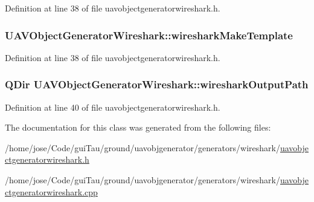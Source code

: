 Definition at line 38 of file uavobjectgeneratorwireshark.\-h.

\hypertarget{class_u_a_v_object_generator_wireshark_afda0123ec94dd04a3273d5916f94c880}{
\subsubsection[{wireshark\-Make\-Template}]{ U\-A\-V\-Object\-Generator\-Wireshark\-::wireshark\-Make\-Template}}\label{class_u_a_v_object_generator_wireshark_afda0123ec94dd04a3273d5916f94c880}


Definition at line 38 of file uavobjectgeneratorwireshark.\-h.

\hypertarget{class_u_a_v_object_generator_wireshark_a7b0aa9382772edcb5f83a441c739660b}{
\subsubsection[{wireshark\-Output\-Path}]{\setlength{\rightskip}{0pt plus 5cm}Q\-Dir U\-A\-V\-Object\-Generator\-Wireshark\-::wireshark\-Output\-Path}}\label{class_u_a_v_object_generator_wireshark_a7b0aa9382772edcb5f83a441c739660b}


Definition at line 40 of file uavobjectgeneratorwireshark.\-h.



The documentation for this class was generated from the following files\-:\begin{DoxyCompactItemize}
\item 
/home/jose/\-Code/gui\-Tau/ground/uavobjgenerator/generators/wireshark/\hyperlink{uavobjectgeneratorwireshark_8h}{uavobjectgeneratorwireshark.\-h}\item 
/home/jose/\-Code/gui\-Tau/ground/uavobjgenerator/generators/wireshark/\hyperlink{uavobjectgeneratorwireshark_8cpp}{uavobjectgeneratorwireshark.\-cpp}\end{DoxyCompactItemize}

